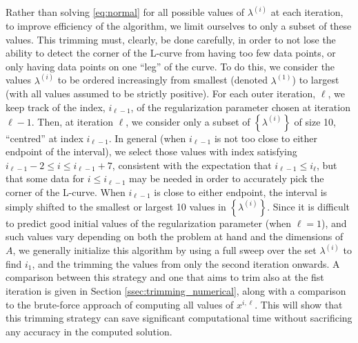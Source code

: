 Rather than solving \eqref{eq:normal} for all possible values of
$\lambda^{(i)}$ at each iteration, to improve efficiency of the
algorithm, we limit ourselves to only a subset of these values.
This trimming must, clearly, be done carefully, in order to not lose
the ability to detect the corner of the L-curve from having too few
data points, or only having data points on one ``leg'' of the curve.
To do this, we consider the values $\lambda^{(i)}$ to be ordered
increasingly from smallest (denoted $\lambda^{(1)}$) to largest (with
all values assumed to be strictly positive).  For each outer
iteration, $\ell$, we keep track of the index, $i_{\ell-1}$, of the
regularization parameter chosen at iteration $\ell-1$.  Then, at iteration $\ell$, we consider only a subset
of $\left\{\lambda^{(i)}\right\}$ of size 10, ``centred'' at index
$i_{\ell-1}$.  In general (when $i_{\ell-1}$ is not too close to
either endpoint of the interval), we select those values with index
satisfying $i_{\ell-1}-2 \leq i \leq i_{\ell-1}+7$, consistent with
the expectation that $i_{\ell-1} \leq i_\ell$, but that some data for
$i \leq i_{\ell-1}$ may be needed in order to accurately pick the
corner of the L-curve.  When $i_{\ell-1}$ is close to either endpoint,
the interval is simply shifted to the smallest or largest 10 values in
$\left\{\lambda^{(i)}\right\}$.  Since it is difficult to predict good
initial values of the regularization parameter (when $\ell = 1$), and
such values vary depending on both the problem at hand and the
dimensions of $A$, we generally initialize this algorithm by using a full sweep
over the set $\lambda^{(i)}$ to find $i_1$, and the trimming the
values from only the second iteration onwards.  A comparison between
this strategy and one that aims to trim also at the fist iteration is
given in Section \ref{ssec:trimming_numerical}, along with a
comparison to the brute-force approach of computing
all values of $x^{i,\ell}$.  This will show that this trimming strategy can save significant
computational time without sacrificing any accuracy in the computed
solution.

